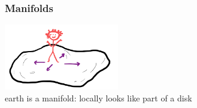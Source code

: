 \begin{frame}
  \frametitle{Manifolds}
  \includegraphics[width=5cm]{images/person_moving.png}\pause
  \\
  earth is a manifold: locally looks like part of a disk
\end{frame}

